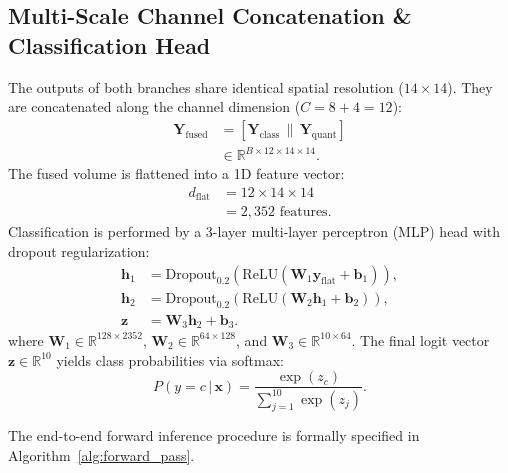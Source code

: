 \documentclass[pdflatex,sn-mathphys-num]{sn-jnl}%
\theoremstyle{thmstyleone}%
\theoremstyle{thmstyletwo}%
\theoremstyle{thmstylethree}%
\begin{document}
\subsection{Multi-Scale Channel Concatenation \& Classification Head}
The outputs of both branches share identical spatial resolution ($14 \times 14$). They are concatenated along the channel dimension ($C = 8 + 4 = 12$):
\begin{align}
\mathbf{Y}_{\mathrm{fused}} &= \left[ \mathbf{Y}_{\mathrm{class}} \,\|\, \mathbf{Y}_{\mathrm{quant}} \right] \nonumber \\
&\in \mathbb{R}^{B \times 12 \times 14 \times 14}.
\label{eq:channel_concat}
\end{align}
The fused volume is flattened into a 1D feature vector:
\begin{align}
d_{\mathrm{flat}} &= 12 \times 14 \times 14 \nonumber \\
&= 2{,}352 \text{ features}.
\label{eq:flatten_dim}
\end{align}
Classification is performed by a 3-layer multi-layer perceptron (MLP) head with dropout regularization:
\begin{align}
\mathbf{h}_1 &= \mathrm{Dropout}_{0.2}(\mathrm{ReLU}(\mathbf{W}_1 \mathbf{y}_{\mathrm{flat}} + \mathbf{b}_1)), \nonumber \\
\mathbf{h}_2 &= \mathrm{Dropout}_{0.2}(\mathrm{ReLU}(\mathbf{W}_2 \mathbf{h}_1 + \mathbf{b}_2)), \nonumber \\
\mathbf{z} &= \mathbf{W}_3 \mathbf{h}_2 + \mathbf{b}_3.
\label{eq:dense_head}
\end{align}
where $\mathbf{W}_1 \in \mathbb{R}^{128 \times 2352}$, $\mathbf{W}_2 \in \mathbb{R}^{64 \times 128}$, and $\mathbf{W}_3 \in \mathbb{R}^{10 \times 64}$. The final logit vector $\mathbf{z} \in \mathbb{R}^{10}$ yields class probabilities via softmax:
\begin{equation}
P(y = c \,|\, \mathbf{x}) = \frac{\exp(z_c)}{\sum_{j=1}^{10} \exp(z_j)}.
\label{eq:softmax}
\end{equation}

The end-to-end forward inference procedure is formally specified in Algorithm~\ref{alg:forward_pass}.
\end{document}
